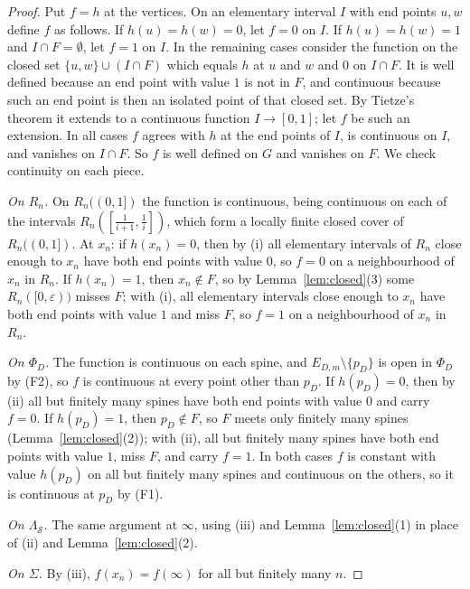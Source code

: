 \documentclass[11pt]{amsart}
\theoremstyle{definition}
\theoremstyle{remark}
\newcommand{\cS}{\mathcal{S}}
\numberwithin{equation}{section}
\begin{document}
\begin{proof}
Put $f=h$ at the vertices. On an elementary interval $I$ with end points $u,w$ define $f$ as follows. If $h(u)=h(w)=0$, let $f=0$ on $I$. If $h(u)=h(w)=1$ and $I\cap F=\emptyset$, let $f=1$ on $I$. In the remaining cases consider the function on the closed set $\{u,w\}\cup(I\cap F)$ which equals $h$ at $u$ and $w$ and $0$ on $I\cap F$. It is well defined because an end point with value $1$ is not in $F$, and continuous because such an end point is then an isolated point of that closed set. By Tietze's theorem it extends to a continuous function $I\to[0,1]$; let $f$ be such an extension. In all cases $f$ agrees with $h$ at the end points of $I$, is continuous on $I$, and vanishes on $I\cap F$. So $f$ is well defined on $G$ and vanishes on $F$. We check continuity on each piece.

\emph{On $R_n$.} On $R_n((0,1])$ the function is continuous, being continuous on each of the intervals $R_n([\frac1{i+1},\frac1i])$, which form a locally finite closed cover of $R_n((0,1])$. At $x_n$: if $h(x_n)=0$, then by (i) all elementary intervals of $R_n$ close enough to $x_n$ have both end points with value $0$, so $f=0$ on a neighbourhood of $x_n$ in $R_n$. If $h(x_n)=1$, then $x_n\notin F$, so by Lemma~\ref{lem:closed}(3) some $R_n([0,\varepsilon))$ misses $F$; with (i), all elementary intervals close enough to $x_n$ have both end points with value $1$ and miss $F$, so $f=1$ on a neighbourhood of $x_n$ in $R_n$.

\emph{On $\Phi_D$.} The function is continuous on each spine, and $E_{D,m}\setminus\{p_D\}$ is open in $\Phi_D$ by (F2), so $f$ is continuous at every point other than $p_D$. If $h(p_D)=0$, then by (ii) all but finitely many spines have both end points with value $0$ and carry $f=0$. If $h(p_D)=1$, then $p_D\notin F$, so $F$ meets only finitely many spines (Lemma~\ref{lem:closed}(2)); with (ii), all but finitely many spines have both end points with value $1$, miss $F$, and carry $f=1$. In both cases $f$ is constant with value $h(p_D)$ on all but finitely many spines and continuous on the others, so it is continuous at $p_D$ by (F1).

\emph{On $\Lambda_\cS$.} The same argument at $\infty$, using (iii) and Lemma~\ref{lem:closed}(1) in place of (ii) and Lemma~\ref{lem:closed}(2).

\emph{On $\Sigma$.} By (iii), $f(x_n)=f(\infty)$ for all but finitely many $n$.
\end{proof}
\end{document}
